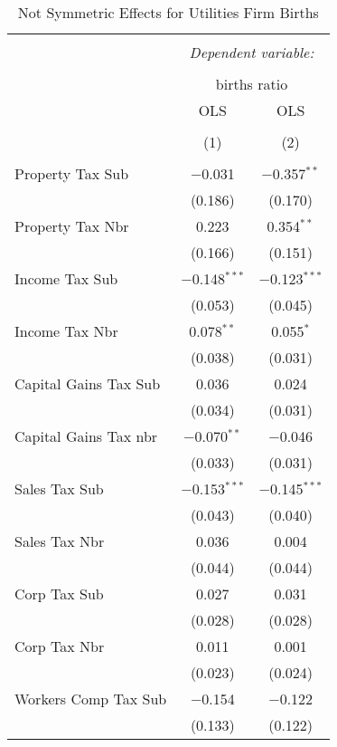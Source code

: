
\begin{table}[!htbp] \centering 
  \caption{Not Symmetric Effects for  Utilities Firm Births} 
  \label{22noequality} 
\begin{tabular}{@{\extracolsep{5pt}}lcc} 
\\[-1.8ex]\hline 
\hline \\[-1.8ex] 
 & \multicolumn{2}{c}{\textit{Dependent variable:}} \\ 
\cline{2-3} 
\\[-1.8ex] & \multicolumn{2}{c}{births ratio} \\ 
 & OLS & OLS \\ 
\\[-1.8ex] & (1) & (2)\\ 
\hline \\[-1.8ex] 
 Property Tax Sub & $-$0.031 & $-$0.357$^{**}$ \\ 
  & (0.186) & (0.170) \\ 
  Property Tax Nbr & 0.223 & 0.354$^{**}$ \\ 
  & (0.166) & (0.151) \\ 
  Income Tax Sub & $-$0.148$^{***}$ & $-$0.123$^{***}$ \\ 
  & (0.053) & (0.045) \\ 
  Income Tax Nbr & 0.078$^{**}$ & 0.055$^{*}$ \\ 
  & (0.038) & (0.031) \\ 
  Capital Gains Tax Sub & 0.036 & 0.024 \\ 
  & (0.034) & (0.031) \\ 
  Capital Gains Tax nbr & $-$0.070$^{**}$ & $-$0.046 \\ 
  & (0.033) & (0.031) \\ 
  Sales Tax Sub & $-$0.153$^{***}$ & $-$0.145$^{***}$ \\ 
  & (0.043) & (0.040) \\ 
  Sales Tax Nbr & 0.036 & 0.004 \\ 
  & (0.044) & (0.044) \\ 
  Corp Tax Sub & 0.027 & 0.031 \\ 
  & (0.028) & (0.028) \\ 
  Corp Tax Nbr & 0.011 & 0.001 \\ 
  & (0.023) & (0.024) \\ 
  Workers Comp Tax Sub & $-$0.154 & $-$0.122 \\ 
  & (0.133) & (0.122) \\ 

\end{tabular}
\end{table}
